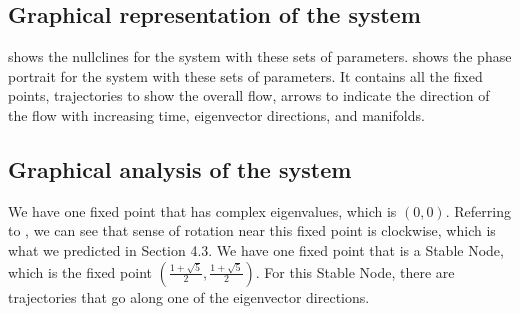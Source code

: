 \subsection{Graphical representation of the system}\label{subsec:graphical-representation-of-the-system}
 shows the nullclines for the system with these sets of parameters.  shows the phase portrait for the system with these sets of parameters. It contains all the fixed points, trajectories to show the overall flow, arrows to indicate the direction of the flow with increasing time, eigenvector directions, and manifolds.

\subsection{Graphical analysis of the system}\label{subsec:graphical-analysis-of-the-system}
We have one fixed point that has complex eigenvalues, which is $(0,0)$. Referring to , we can see that sense of rotation near this fixed point is clockwise, which is what we predicted in Section 4.3. We have one fixed point that is a Stable Node, which is the fixed point $\left(\frac{1+\sqrt{5}}{2}, \frac{1+\sqrt{5}}{2}\right)$. For this Stable Node, there are trajectories that go along one of the eigenvector directions.
